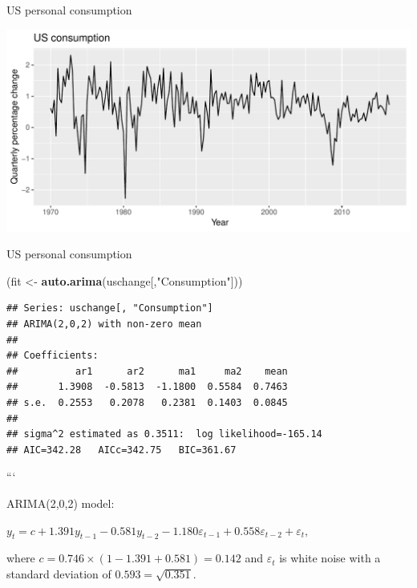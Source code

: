 \documentclass[14pt,ignorenonframetext,]{beamer}
\newenvironment{Shaded}{\begin{snugshade}}{\end{snugshade}}
\newcommand{\KeywordTok}[1]{\textcolor[rgb]{0.13,0.29,0.53}{\textbf{#1}}}
\newcommand{\StringTok}[1]{\textcolor[rgb]{0.31,0.60,0.02}{#1}}
\newcommand{\NormalTok}[1]{#1}
\begin{document}
\begin{frame}{US personal consumption}

\includegraphics{week_5_arima_files/figure-beamer/unnamed-chunk-24-1.pdf}

\end{frame}

\begin{frame}[fragile]{US personal consumption}

\fontsize{10}{11}\sf

\begin{Shaded}
\begin{Highlighting}[]
\NormalTok{(fit <-}\StringTok{ }\KeywordTok{auto.arima}\NormalTok{(uschange[,}\StringTok{"Consumption"}\NormalTok{]))}
\end{Highlighting}
\end{Shaded}

\begin{verbatim}
## Series: uschange[, "Consumption"] 
## ARIMA(2,0,2) with non-zero mean 
## 
## Coefficients:
##          ar1      ar2      ma1     ma2    mean
##       1.3908  -0.5813  -1.1800  0.5584  0.7463
## s.e.  0.2553   0.2078   0.2381  0.1403  0.0845
## 
## sigma^2 estimated as 0.3511:  log likelihood=-165.14
## AIC=342.28   AICc=342.75   BIC=361.67
\end{verbatim}

\pause\vfill

```

\begin{block}{ARIMA(2,0,2) model:}

\centerline{$
  y_t = c + 1.391y_{t-1}
          -0.581 y_{t-2}
          -1.180 \varepsilon_{t-1}
          + 0.558 \varepsilon_{t-2}
          + \varepsilon_{t},
$}

where \(c= 0.746 \times (1 - 1.391 + 0.581) = 0.142\) and
\(\varepsilon_t\) is white noise with a standard deviation of
\(0.593 = \sqrt{0.351}\).

\end{block}

\end{frame}
\end{document}
